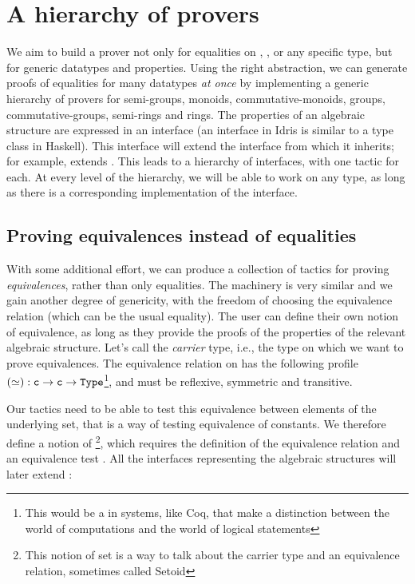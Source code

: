 \section{A hierarchy of provers}

We aim to build a prover not only for equalities on , , or
any specific type, but for generic datatypes and properties. Using
the right
abstraction, we can generate proofs of equalities for
many datatypes \emph{at once} by implementing a generic hierarchy of provers
for semi-groups, monoids,
commutative-monoids, groups, commutative-groups, semi-rings and rings.
The properties of an algebraic structure are expressed in an
interface (an interface in Idris is similar to a type class
in Haskell). This interface will extend the interface from which it
inherits; for example,  extends .
This leads to a hierarchy of interfaces, with one tactic
for each. At every level of the hierarchy, we will be able
to work on any type, as long as there is a corresponding implementation of
the interface.

\subsection{Proving equivalences instead of equalities}
	
With some additional effort, we can produce a collection of tactics for proving
\emph{equivalences}, rather than only equalities. 
The machinery is very similar and
we gain another
degree of genericity, with the freedom of choosing the equivalence relation
(which can be the usual equality). 
The user can define their own
notion of equivalence, as long as they provide the proofs of the
properties of the relevant algebraic structure. Let's call  the
\emph{carrier} type, i.e., the type on which we want to prove equivalences. 
The
equivalence relation on  has the following profile $(\simeq) : {\mbox{\texttt{c}}}
\rightarrow {\mbox{\texttt{c}}} \rightarrow {\mbox{\texttt{Type}}}$\footnote{This  would
be a  in systems, like Coq, that make a distinction between the
world of computations and the world of logical statements}, and must be reflexive, symmetric and transitive.

Our tactics need to be able to test this equivalence
between elements of the underlying set, that is a way of testing
equivalence of constants. We therefore define a notion of
\footnote{This notion of set 
is a way to talk about the carrier type and an equivalence
relation, sometimes called Setoid}, which requires the definition of the
equivalence relation and an equivalence test . All the interfaces
representing the algebraic structures will later extend :

